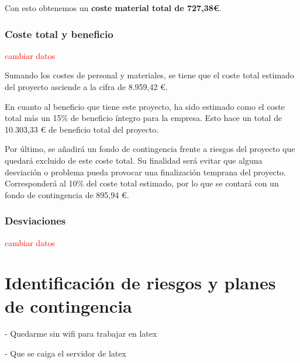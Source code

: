 Con esto obtenemos un \textbf{coste material total de 727,38€}.

\subsubsection{Coste total y beneficio}

\textcolor{red}{cambiar datos}

Sumando los costes de personal y materiales, se tiene que el coste total estimado del proyecto asciende a la cifra de 8.959,42 €.

En cuanto al beneficio que tiene este proyecto, ha sido estimado como el coste total más un 15\% de beneficio íntegro para la empresa. Esto hace un total de 10.303,33 € de beneficio total del proyecto.

Por último, se añadirá un fondo de contingencia frente a riesgos del proyecto que quedará excluido de este coste total. Su finalidad será evitar que alguna desviación o problema pueda provocar una finalización temprana del proyecto. Corresponderá al 10\% del coste total estimado, por lo que se contará con un fondo de contingencia de 895,94 €.

\subsubsection{Desviaciones}

\textcolor{red}{cambiar datos}


\section{Identificación de riesgos y planes de contingencia} \label{sec:03Riesgos}

- Quedarme sin wifi para trabajar en latex

- Que se caiga el servidor de latex